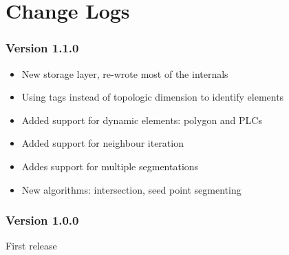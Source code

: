 
\chapter{Change Logs}

\subsection*{Version 1.1.0}
\begin{itemize}
 \item New storage layer, re-wrote most of the internals
 \item Using tags instead of topologic dimension to identify elements
 \item Added support for dynamic elements: polygon and PLCs
 \item Added support for neighbour iteration
 \item Addes support for multiple segmentations
 \item New algorithms: intersection, seed point segmenting
\end{itemize}

\subsection*{Version 1.0.0}
First release
